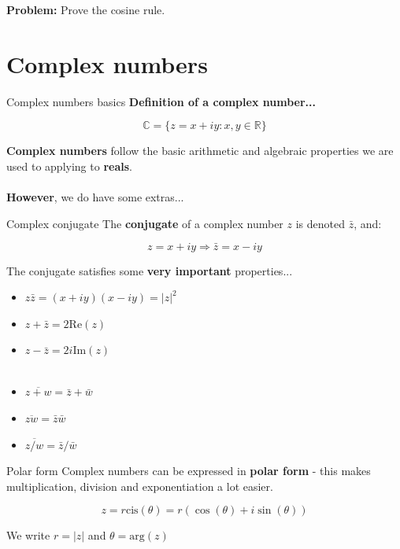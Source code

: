 \documentclass{beamer}
\begin{document}
\begin{frame}
	\textbf{Problem: } Prove the cosine rule.
	\vspace{5cm}
\end{frame}

\section{Complex numbers}

\begin{frame}{Complex numbers basics}
	\textbf{Definition of a complex number...}
	
	$$\mathbb{C} = \{z = x + iy : x, y \in \mathbb{R} \}$$
	
	
	\textbf{Complex numbers} follow the basic arithmetic and algebraic properties we are used to applying to \textbf{reals}.
	\\~\\
	\textbf{However}, we do have some extras...

\end{frame}

\begin{frame}{Complex conjugate}
	The \textbf{conjugate} of a complex number $z$ is denoted $\bar{z}$, and:
	
	$$z = x + iy \Rightarrow \bar{z} = x - iy$$
	
	The conjugate satisfies some \textbf{very important} properties...
	\begin{itemize}
		\item $z\bar{z} = (x + iy)(x - iy) = |z|^2$
		\item $z + \bar{z} = 2\mathrm{Re}(z)$
		\item $z - \bar{z} = 2i\mathrm{Im}(z)$
		\\~\\
		\item $\overline{z + w} = \bar{z} + \bar{w}$
		\item $\overline{zw} = \bar{z}\bar{w}$
		\item $\overline{z/w} = \bar{z}/\bar{w}$
	\end{itemize}
	
	
\end{frame}

\begin{frame}{Polar form}
	Complex numbers can be expressed in \textbf{polar form} - this makes multiplication, division and exponentiation a lot easier.
	
	$$z = r\mathrm{cis}(\theta) = r(\cos(\theta) + i \sin(\theta))$$
	\vspace{5cm}
	
	We write $r = |z|$ and $\theta = \mathrm{arg}(z)$
\end{frame}
\end{document}
